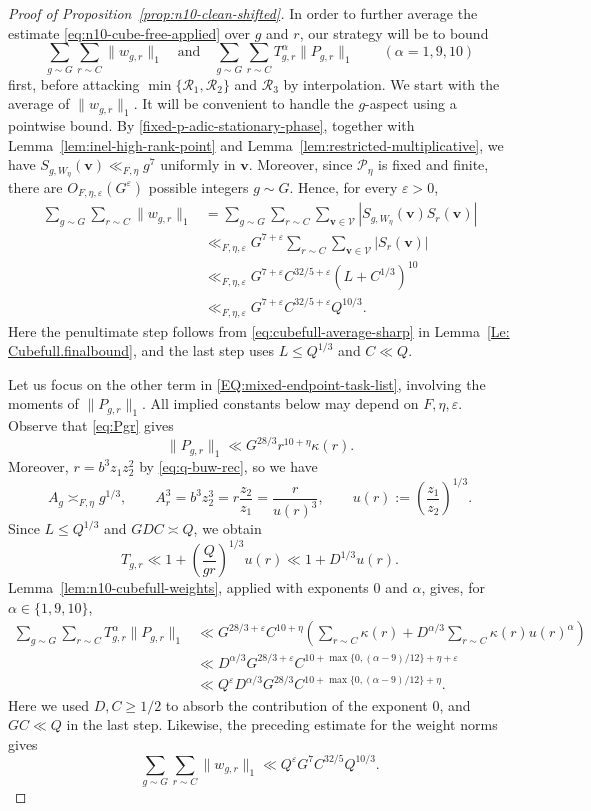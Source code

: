 \documentclass[a4paper,11pt, twoside,reqno]{amsart}
\theoremstyle{plain}
\theoremstyle{definition}
\theoremstyle{remark}
\newcommand{\bfv}{\bm{v}}
\newcommand{\ve}{\varepsilon}
\renewcommand{\leq}{\leqslant}
\renewcommand{\ge}{\geqslant}
\numberwithin{equation}{section}
\begin{document}
\begin{proof}[Proof of Proposition~\ref{prop:n10-clean-shifted}]
In order to further average the estimate \eqref{eq:n10-cube-free-applied}
over $g$ and $r$,
our strategy will be to bound
\begin{equation}
\label{EQ:mixed-endpoint-task-list}
\sum_{g\sim G}\sum_{r\sim C}\|w_{g,r}\|_1
\quad\text{and}\quad
\sum_{g\sim G}\sum_{r\sim C}
T_{g,r}^{\alpha}\|P_{g,r}\|_1
\qquad(\alpha=1,9,10)
\end{equation}
first, before attacking $\min\{\mathcal R_1,\mathcal R_2\}$
and $\mathcal R_3$ by interpolation.
We start with the average of $\|w_{g,r}\|_1$.
It will be convenient to handle the $g$-aspect using a pointwise bound.
By \eqref{fixed-p-adic-stationary-phase}, together with
Lemma~\ref{lem:inel-high-rank-point} and
Lemma~\ref{lem:restricted-multiplicative}, we have
$S_{g,W_\eta}(\bfv)\ll_{F,\eta}g^7$
uniformly in $\bfv$.
Moreover, since $\mathcal P_\eta$ is fixed and finite,
there are $O_{F,\eta,\ve}(G^\ve)$ possible integers
$g\sim G$. Hence, for every $\ve>0$,
\[
\begin{split}
\sum_{g\sim G}\sum_{r\sim C}\|w_{g,r}\|_1
&=
\sum_{g\sim G}\sum_{r\sim C}
\sum_{\bfv\in\mathcal V}
|S_{g,W_\eta}(\bfv)S_r(\bfv)|\\
&\ll_{F,\eta,\ve}
G^{7+\ve}
\sum_{r\sim C}\sum_{\bfv\in\mathcal V}
|S_r(\bfv)|\\
&\ll_{F,\eta,\ve}
G^{7+\ve}C^{32/5+\ve}(L+C^{1/3})^{10}\\
&\ll_{F,\eta,\ve}
G^{7+\ve}C^{32/5+\ve}Q^{10/3}.
\end{split}
\]
Here the penultimate step follows from 
 \eqref{eq:cubefull-average-sharp} in Lemma~\ref{Le: Cubefull.finalbound}, and the
last step uses $L\leq Q^{1/3}$ and $C\ll Q$.

Let us focus on the other term in \eqref{EQ:mixed-endpoint-task-list},
involving the moments of $\|P_{g,r}\|_1$.
All implied constants below may depend on
$F,\eta,\ve$.
Observe that \eqref{eq:Pgr} gives
\[
\|P_{g,r}\|_1
\ll
G^{28/3}r^{10+\eta}\kappa(r).
\]
Moreover, $r=b^3z_1z_2^2$ by \eqref{eq:q-buw-rec}, so we have
\[
A_g\asymp_{F,\eta}g^{1/3},
\qquad
A_r^3=b^3z_2^3 = r\frac{z_2}{z_1}=\frac{r}{u(r)^3},
\qquad
u(r):=\left(\frac{z_1}{z_2}\right)^{1/3}.
\]
Since $L\leq Q^{1/3}$ and $GDC\asymp Q$, we obtain
\[
T_{g,r}
\ll
1+\left(\frac{Q}{gr}\right)^{1/3}u(r)
\ll
1+D^{1/3}u(r).
\]
Lemma~\ref{lem:n10-cubefull-weights}, applied with
exponents $0$ and $\alpha$, gives, for
$\alpha\in\{1,9,10\}$,
\[
\begin{split}
\sum_{g\sim G}\sum_{r\sim C}
T_{g,r}^{\alpha}\|P_{g,r}\|_1
&\ll
G^{28/3+\ve}C^{10+\eta}
\left(
\sum_{r\sim C}\kappa(r)
+
D^{\alpha/3}
\sum_{r\sim C}\kappa(r)u(r)^\alpha
\right)\\
&\ll
D^{\alpha/3}G^{28/3+\ve}
C^{10+\max\{0,(\alpha-9)/12\}+\eta+\ve}\\
&\ll
Q^\ve D^{\alpha/3}G^{28/3}
C^{10+\max\{0,(\alpha-9)/12\}+\eta}.
\end{split}
\]
Here we used $D,C\ge 1/2$ to absorb the contribution
of the exponent $0$, and $GC\ll Q$ in the last step.
Likewise, the preceding estimate for the weight norms
gives
\[
\sum_{g\sim G}\sum_{r\sim C}\|w_{g,r}\|_1
\ll
Q^\ve G^7C^{32/5}Q^{10/3}.
\]


\end{proof}
\end{document}
